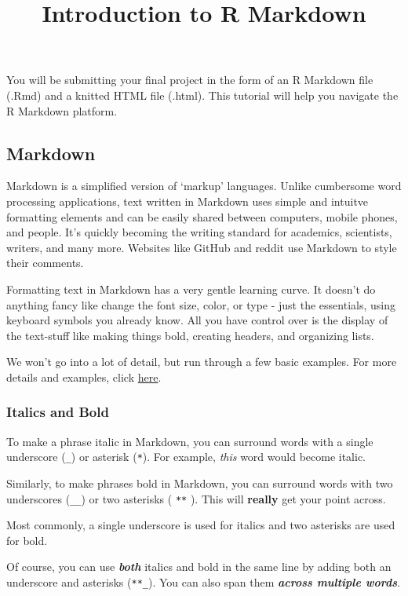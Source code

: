 \documentclass[
]{article}
\title{Introduction to R Markdown}
\author{}
\date{\vspace{-2.5em}}
\begin{document}
\maketitle

You will be submitting your final project in the form of an R Markdown
file (.Rmd) and a knitted HTML file (.html). This tutorial will help you
navigate the R Markdown platform.

\hypertarget{markdown}{%
\subsection{Markdown}\label{markdown}}

Markdown is a simplified version of `markup' languages. Unlike
cumbersome word processing applications, text written in Markdown uses
simple and intuitve formatting elements and can be easily shared between
computers, mobile phones, and people. It's quickly becoming the writing
standard for academics, scientists, writers, and many more. Websites
like GitHub and reddit use Markdown to style their comments.

Formatting text in Markdown has a very gentle learning curve. It doesn't
do anything fancy like change the font size, color, or type - just the
essentials, using keyboard symbols you already know. All you have
control over is the display of the text-stuff like making things bold,
creating headers, and organizing lists.

We won't go into a lot of detail, but run through a few basic examples.
For more details and examples, click
\href{https://www.markdowntutorial.com/}{here}.

\hypertarget{italics-and-bold}{%
\subsubsection{Italics and Bold}\label{italics-and-bold}}

To make a phrase italic in Markdown, you can surround words with a
single underscore (\texttt{\_}) or asterisk (\texttt{*}). For example,
\emph{this} word would become italic.

Similarly, to make phrases bold in Markdown, you can surround words with
two underscores (\texttt{\_\_}) or two asterisks ( \texttt{**} ). This
will \textbf{really} get your point across.

Most commonly, a single underscore is used for italics and two asterisks
are used for bold.

Of course, you can use \textbf{\emph{both}} italics and bold in the same
line by adding both an underscore and asterisks (\texttt{**\_}). You can
also span them \textbf{\emph{across multiple words}}.
\end{document}
